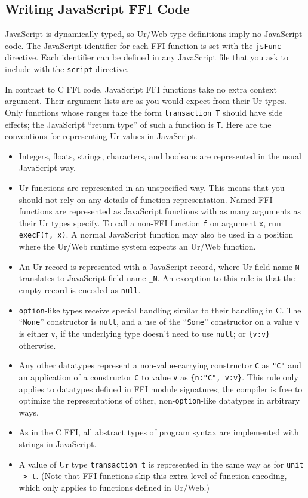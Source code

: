 \documentclass{article}
\begin{document}
\subsection{Writing JavaScript FFI Code}

JavaScript is dynamically typed, so Ur/Web type definitions imply no JavaScript code.  The JavaScript identifier for each FFI function is set with the \texttt{jsFunc} directive.  Each identifier can be defined in any JavaScript file that you ask to include with the \texttt{script} directive.

In contrast to C FFI code, JavaScript FFI functions take no extra context argument.  Their argument lists are as you would expect from their Ur types.  Only functions whose ranges take the form \texttt{transaction T} should have side effects; the JavaScript ``return type'' of such a function is \texttt{T}.  Here are the conventions for representing Ur values in JavaScript.

\begin{itemize}
\item Integers, floats, strings, characters, and booleans are represented in the usual JavaScript way.
\item Ur functions are represented in an unspecified way.  This means that you should not rely on any details of function representation.  Named FFI functions are represented as JavaScript functions with as many arguments as their Ur types specify.  To call a non-FFI function \texttt{f} on argument \texttt{x}, run \texttt{execF(f, x)}.  A normal JavaScript function may also be used in a position where the Ur/Web runtime system expects an Ur/Web function.
\item An Ur record is represented with a JavaScript record, where Ur field name \texttt{N} translates to JavaScript field name \texttt{\_N}.  An exception to this rule is that the empty record is encoded as \texttt{null}.
\item \texttt{option}-like types receive special handling similar to their handling in C.  The ``\texttt{None}'' constructor is \texttt{null}, and a use of the ``\texttt{Some}'' constructor on a value \texttt{v} is either \texttt{v}, if the underlying type doesn't need to use \texttt{null}; or \texttt{\{v:v\}} otherwise.
\item Any other datatypes represent a non-value-carrying constructor \texttt{C} as \texttt{"C"} and an application of a constructor \texttt{C} to value \texttt{v} as \texttt{\{n:"C", v:v\}}.  This rule only applies to datatypes defined in FFI module signatures; the compiler is free to optimize the representations of other, non-\texttt{option}-like datatypes in arbitrary ways.
\item As in the C FFI, all abstract types of program syntax are implemented with strings in JavaScript.
\item A value of Ur type \texttt{transaction t} is represented in the same way as for \texttt{unit -> t}.  (Note that FFI functions skip this extra level of function encoding, which only applies to functions defined in Ur/Web.)
\end{itemize}
\end{document}
